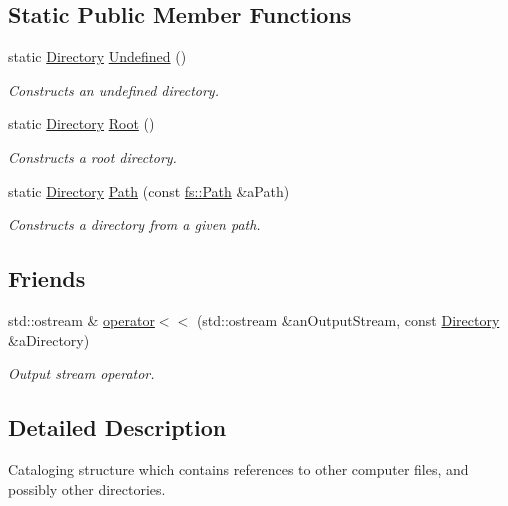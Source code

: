 \subsection*{Static Public Member Functions}
\begin{DoxyCompactItemize}
\item 
static \hyperlink{classostk_1_1core_1_1fs_1_1_directory}{Directory} \hyperlink{classostk_1_1core_1_1fs_1_1_directory_a1ead445a6b0f2b020ab61c2653bb8faa}{Undefined} ()
\begin{DoxyCompactList}\small\item\em Constructs an undefined directory. \end{DoxyCompactList}\item 
static \hyperlink{classostk_1_1core_1_1fs_1_1_directory}{Directory} \hyperlink{classostk_1_1core_1_1fs_1_1_directory_a0e6db71e5632f6b0ea4ad3fabd4c00db}{Root} ()
\begin{DoxyCompactList}\small\item\em Constructs a root directory. \end{DoxyCompactList}\item 
static \hyperlink{classostk_1_1core_1_1fs_1_1_directory}{Directory} \hyperlink{classostk_1_1core_1_1fs_1_1_directory_a0151dba2940d5f426b52209dc7dab2e5}{Path} (const \hyperlink{classostk_1_1core_1_1fs_1_1_path}{fs\+::\+Path} \&a\+Path)
\begin{DoxyCompactList}\small\item\em Constructs a directory from a given path. \end{DoxyCompactList}\end{DoxyCompactItemize}
\subsection*{Friends}
\begin{DoxyCompactItemize}
\item 
std\+::ostream \& \hyperlink{classostk_1_1core_1_1fs_1_1_directory_a3cbfede39f82ab145f110ca14e21deef}{operator$<$$<$} (std\+::ostream \&an\+Output\+Stream, const \hyperlink{classostk_1_1core_1_1fs_1_1_directory}{Directory} \&a\+Directory)
\begin{DoxyCompactList}\small\item\em Output stream operator. \end{DoxyCompactList}\end{DoxyCompactItemize}


\subsection{Detailed Description}
Cataloging structure which contains references to other computer files, and possibly other directories. 

